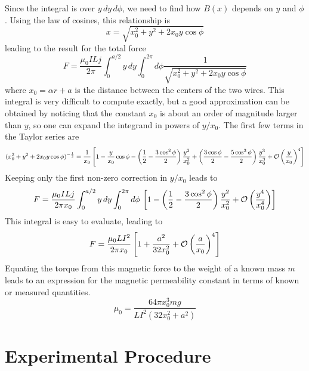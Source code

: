\documentclass{revtex4}
\begin{document}
Since the integral is over $y\,dy\,d\phi$, we need to find how $B(x)$
depends on $y$ and $\phi$.  Using the law of cosines, this relationship is
\begin{equation}
x=\sqrt{x_0^2+y^2+2x_0y\cos{\phi}}
\end{equation}
leading to the result for the total force
\begin{equation}
F= \frac{\mu_0ILj}{2\pi}\int_0^{a/2}y\,dy \int_0^{2\pi}d\phi
\frac{1}{\sqrt{{x_0^2+y^2+2x_0y\cos{\phi}}}}
\end{equation}
where $x_0=\alpha r+a$ is the distance between the centers of the two wires.
This integral is very difficult to compute exactly, but a good approximation
can be obtained by noticing that the constant $x_0$ is about an order of
magnitude larger than $y$, so one can expand the integrand in powers of
$y/x_0$.  The first few terms in the Taylor series are
\begin{equation}
({x_0^2+y^2+2x_0y\cos{\phi}})^{-\frac{1}{2}} =
\frac{1}{x_0}\left[1
- \frac{y}{x_0}\cos{\phi}
-\left(\frac{1}{2}-\frac{3\cos^2{\phi}}{2}\right)\frac{y^2}{x_0^2}
+\left(\frac{3\cos{\phi}}{2}-\frac{5\cos^3{\phi}}{2}\right)\frac{y^3}{x_0^3}
+ {\cal O}\left(\frac{y}{x_0}\right)^4\right]
\end{equation}
Keeping only the first non-zero correction in $y/x_0$ leads to
\begin{equation}
F= \frac{\mu_0ILj}{2\pi x_0}\int_0^{a/2}y\,dy \int_0^{2\pi}d\phi
\,\left[1-
\left(\frac{1}{2}-\frac{3\cos^2{\phi}}{2}\right)\frac{y^2}{x_0^2}
+{\cal O}\left(\frac{y^4}{x_0^4}\right)\right]
\end{equation}
This integral is easy to evaluate, leading to
\begin{equation}
F = \frac{\mu_0LI^2}{2\pi x_0}\left[1+\frac{a^2}{32x_0^2}
+ {\cal O}\left(\frac{a}{x_0}\right)^4\right]
\label{eq:Fofa}
\end{equation}
Equating the torque from this magnetic force to the weight of a known
mass $m$ leads to an expression for the magnetic permeability constant
in terms of known or measured quantities.
\begin{equation}
\mu_0=\frac{64\pi x_0^3 mg}{LI^2(32x_0^2+a^2)}
\label{eq:mu0}
\end{equation}

\section{Experimental Procedure}
\end{document}
